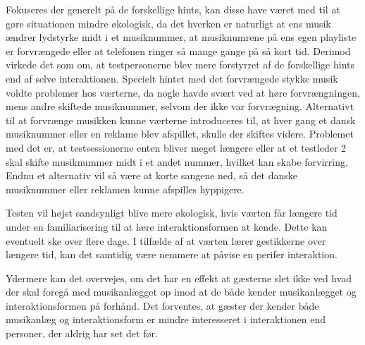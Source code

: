 Fokuseres der generelt på de forskellige hints, kan disse have været med til at gøre situationen mindre økologisk, da det hverken er naturligt at ens musik ændrer lydstyrke midt i et musiknummer, at musiknumrene på ens egen playliste er forvrængede eller at telefonen ringer så mange gange på så kort tid. Derimod virkede det som om, at testpersonerne blev mere forstyrret af de forskellige hints end af selve interaktionen. Specielt hintet med det forvrængede stykke musik voldte problemer hos værterne, da nogle havde svært ved at høre forvrængningen, mens andre skiftede musiknummer, selvom der ikke var forvrægning. Alternativt til at forvrænge musikken kunne værterne introduceres til, at hver gang et dansk musiknummer eller en reklame blev afspillet, skulle der skiftes videre. Problemet med det er, at testsessionerne enten bliver meget længere eller at et testleder 2 skal skifte musiknummer midt i et andet nummer, hvilket kan skabe forvirring. Endnu et alternativ vil så være at korte sangene ned, så det danske musiknummer eller reklamen kunne afspilles hyppigere. 

Testen vil højst sandsynligt blive mere økologisk, hvis værten får længere tid under en familiarisering til at lære interaktionsformen at kende. Dette kan eventuelt ske over flere dage. I tilfælde af at værten lærer gestikkerne over længere tid, kan det samtidig være nemmere at påvise en perifer interaktion.

 Ydermere kan det overvejes, om det har en effekt at gæsterne slet ikke ved hvad der skal foregå med musikanlægget op imod at de både kender musikanlægget og interaktionsformen på forhånd. Det forventes, at gæster der kender både musikanlæg og interaktionsform er mindre interesseret i interaktionen end personer, der aldrig har set det før. 